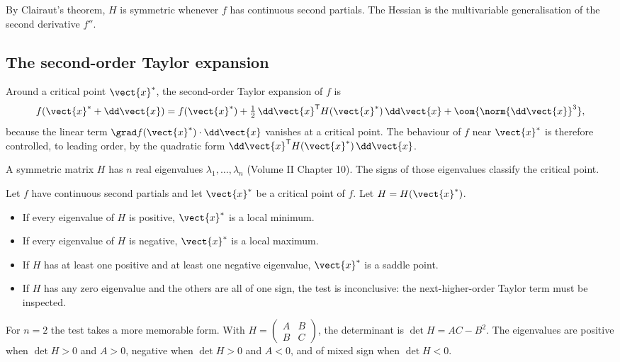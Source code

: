 By Clairaut's theorem, $H$ is symmetric whenever $f$ has continuous
second partials. The Hessian is the multivariable generalisation of
the second derivative $f''$.

\subsection{The second-order Taylor expansion}

Around a critical point $\vect{x}^{*}$, the second-order Taylor
expansion of $f$ is
\[
f(\vect{x}^{*} + \dd\vect{x}) = f(\vect{x}^{*}) +
\tfrac{1}{2}\,\dd\vect{x}^{\mathsf{T}} H(\vect{x}^{*})\,\dd\vect{x}
+ \oom{\norm{\dd\vect{x}}^{3}},
\]
because the linear term $\grad f(\vect{x}^{*}) \cdot \dd\vect{x}$
vanishes at a critical point. The behaviour of $f$ near $\vect{x}^{*}$
is therefore controlled, to leading order, by the quadratic form
$\dd\vect{x}^{\mathsf{T}} H(\vect{x}^{*})\,\dd\vect{x}$.

A symmetric matrix $H$ has $n$ real eigenvalues $\lambda_{1}, \ldots,
\lambda_{n}$ (Volume II Chapter 10). The signs of those eigenvalues
classify the critical point.

\begin{theorem}
Let $f$ have continuous second partials and let $\vect{x}^{*}$ be a
critical point of $f$. Let $H = H(\vect{x}^{*})$.
\begin{itemize}[leftmargin=*]
  \item If every eigenvalue of $H$ is positive, $\vect{x}^{*}$ is a
    local minimum.
  \item If every eigenvalue of $H$ is negative, $\vect{x}^{*}$ is a
    local maximum.
  \item If $H$ has at least one positive and at least one negative
    eigenvalue, $\vect{x}^{*}$ is a saddle point.
  \item If $H$ has any zero eigenvalue and the others are all of
    one sign, the test is inconclusive: the next-higher-order Taylor
    term must be inspected.
\end{itemize}
\end{theorem}

For $n = 2$ the test takes a more memorable form. With $H =
\begin{pmatrix} A & B \\ B & C \end{pmatrix}$, the determinant is
$\det H = AC - B^{2}$. The eigenvalues are positive when $\det H > 0$
and $A > 0$, negative when $\det H > 0$ and $A < 0$, and of mixed
sign when $\det H < 0$.


